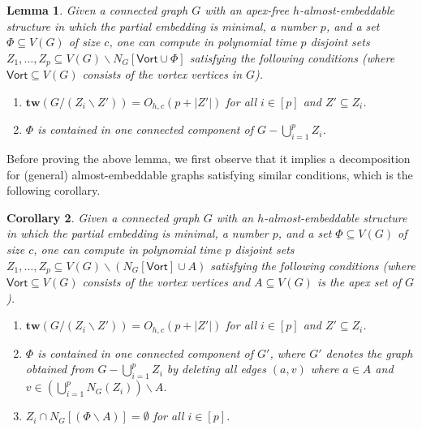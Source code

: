 \documentclass[a4paper,11pt]{article}
\newtheorem{lemma}{Lemma}
\numberwithin{lemma}{section}
\newtheorem{corollary}[lemma]{Corollary}
\newcommand{\tw}{\mathbf{tw}}
\begin{document}
\begin{lemma} \label{lem-decomp1}
Given a connected graph $G$ with an apex-free $h$-almost-embeddable structure in which the partial embedding is minimal, a number $p$, and a set $\varPhi \subseteq V(G)$ of size $c$, one can compute in polynomial time $p$ disjoint sets $Z_1,\dots,Z_p \subseteq V(G) \backslash N_G[\mathsf{Vort} \cup \varPhi]$ satisfying the following conditions (where $\mathsf{Vort} \subseteq V(G)$ consists of the vortex vertices in $G$).
\begin{enumerate}[label = (\arabic*)]
    \item\label{item:decomp1-1} $\tw(G/(Z_i \backslash Z')) = O_{h,c}(p+|Z'|)$ for all $i \in [p]$ and $Z' \subseteq Z_i$.
    \item\label{item:decomp1-2} $\varPhi$ is contained in one connected component of $G - \bigcup_{i=1}^p Z_i$.
\end{enumerate}
\end{lemma}

Before proving the above lemma, we first observe that it implies a decomposition for (general) almost-embeddable graphs satisfying similar conditions, which is the following corollary.

\begin{corollary} \label{cor-decomp2}
Given a connected graph $G$ with an $h$-almost-embeddable structure in which the partial embedding is minimal, a number $p$, and a set $\varPhi \subseteq V(G)$ of size $c$, one can compute in polynomial time $p$ disjoint sets $Z_1,\dots,Z_p \subseteq V(G) \backslash (N_G[\mathsf{Vort}] \cup A)$ satisfying the following conditions (where $\mathsf{Vort} \subseteq V(G)$ consists of the vortex vertices and $A \subseteq V(G)$ is the apex set of $G$).
\begin{enumerate}[label = (\arabic*)]
    \item\label{item:decomp2-1} $\tw(G/(Z_i \backslash Z')) = O_{h,c}(p+|Z'|)$ for all $i \in [p]$ and $Z' \subseteq Z_i$.
    \item\label{item:decomp2-2} $\varPhi$ is contained in one connected component of $G'$, where $G'$ denotes the graph obtained from $G - \bigcup_{i=1}^p Z_i$ by deleting all edges $(a,v)$ where $a \in A$ and $v \in (\bigcup_{i=1}^p N_G(Z_i)) \backslash A$.
    \item\label{item:decomp2-3} $Z_i \cap N_G[(\varPhi \backslash A)] = \emptyset$ for all $i \in [p]$.
\end{enumerate}
\end{corollary}
\end{document}

